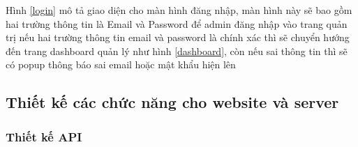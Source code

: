 Hình \ref{login} mô tả giao diện cho màn hình đăng nhập, màn hình này sẽ bao
 gồm hai trường thông tin là Email và Password để admin đăng nhập vào trang quản trị
 nếu hai trường thông tin email và password là chính xác thì sẽ chuyển hướng đến trang dashboard 
 quản lý như hình \ref{dashboard}, còn nếu sai thông tin thì sẽ có popup thông báo sai email hoặc mật khẩu hiện lên
 

\subsection{Thiết kế các chức năng cho website và server}

\subsubsection{Thiết kế API}


